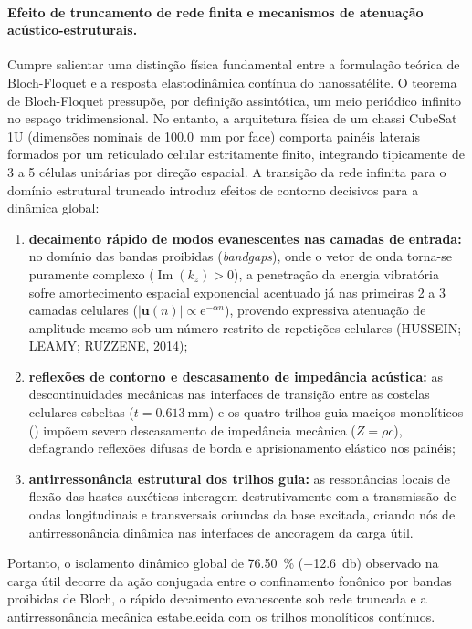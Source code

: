 \paragraph*{Efeito de truncamento de rede finita e mecanismos de atenuação acústico-estruturais.}
Cumpre salientar uma distinção física fundamental entre a formulação teórica de Bloch-Floquet e a resposta elastodinâmica contínua do nanossatélite. O teorema de Bloch-Floquet pressupõe, por definição assintótica, um meio periódico infinito no espaço tridimensional. No entanto, a arquitetura física de um chassi CubeSat 1U (dimensões nominais de \SI{100.0}{\milli\metre} por face) comporta painéis laterais formados por um reticulado celular estritamente finito, integrando tipicamente de 3 a 5 células unitárias por direção espacial. A transição da rede infinita para o domínio estrutural truncado introduz efeitos de contorno decisivos para a dinâmica global:
\begin{enumerate}
  \item \textbf{decaimento rápido de modos evanescentes nas camadas de entrada:} no domínio das bandas proibidas (\textit{bandgaps}), onde o vetor de onda torna-se puramente complexo ($\operatorname{Im}(k_z) > 0$), a penetração da energia vibratória sofre amortecimento espacial exponencial acentuado já nas primeiras 2 a 3 camadas celulares ($|\mathbf{u}(n)| \propto \mathrm{e}^{-\alpha n}$), provendo expressiva atenuação de amplitude mesmo sob um número restrito de repetições celulares (HUSSEIN; LEAMY; RUZZENE, 2014);
  \item \textbf{reflexões de contorno e descasamento de impedância acústica:} as descontinuidades mecânicas nas interfaces de transição entre as costelas celulares esbeltas ($t = \SI{0.613}{\milli\metre}$) e os quatro trilhos guia maciços monolíticos (\rail{}) impõem severo descasamento de impedância mecânica ($Z = \rho c$), deflagrando reflexões difusas de borda e aprisionamento elástico nos painéis;
  \item \textbf{antirressonância estrutural dos trilhos guia:} as ressonâncias locais de flexão das hastes auxéticas interagem destrutivamente com a transmissão de ondas longitudinais e transversais oriundas da base excitada, criando nós de antirressonância dinâmica nas interfaces de ancoragem da carga útil.
\end{enumerate}
Portanto, o isolamento dinâmico global de \SI{76.50}{\percent} (\SI{-12.6}{\decibel}) observado na carga útil decorre da ação conjugada entre o confinamento fonônico por bandas proibidas de Bloch, o rápido decaimento evanescente sob rede truncada e a antirressonância mecânica estabelecida com os trilhos monolíticos contínuos.

